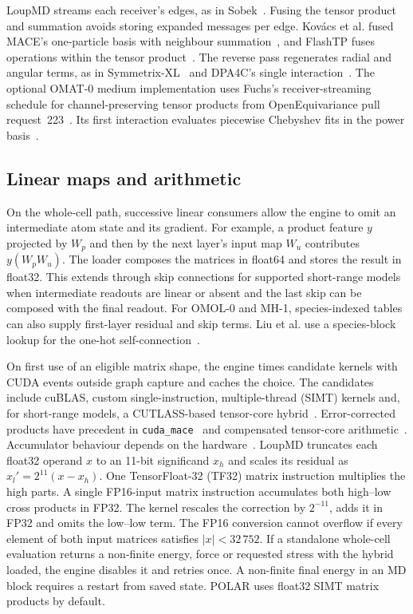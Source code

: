 LoupMD streams each receiver's edges, as in Sobek~\cite{chorosajev2026sobek}. Fusing the tensor product and summation avoids storing expanded messages per edge. Kov\'acs et al. fused MACE's one-particle basis with neighbour summation~\cite[\S III.5]{kovacs2025maceoff}, and FlashTP fuses operations within the tensor product~\cite[\S\S 4.2--4.4]{lee2025flashtp}. The reverse pass regenerates radial and angular terms, as in Symmetrix-XL~\cite[\S 3]{fu2026symmetrixxl} and DPA4C's single interaction~\cite[\S 4.4]{li2026dpa4c}. The optional OMAT-0 medium implementation uses Fuchs's receiver-streaming schedule for channel-preserving tensor products from OpenEquivariance pull request~223~\cite{fuchs2026uvupr}. Its first interaction evaluates piecewise Chebyshev fits in the power basis~\cite{trefethen2013approx}.

\subsection{Linear maps and arithmetic}
On the whole-cell path, successive linear consumers allow the engine to omit an intermediate atom state and its gradient. For example, a product feature $y$ projected by $W_p$ and then by the next layer's input map $W_u$ contributes $y(W_pW_u)$. The loader composes the matrices in float64 and stores the result in float32. This extends through skip connections for supported short-range models when intermediate readouts are linear or absent and the last skip can be composed with the final readout. For OMOL-0 and MH-1, species-indexed tables can also supply first-layer residual and skip terms. Liu et al. use a species-block lookup for the one-hot self-connection~\cite[\S 3.6]{liu2026foundation}.

On first use of an eligible matrix shape, the engine times candidate kernels with CUDA events outside graph capture and caches the choice. The candidates include cuBLAS, custom single-instruction, multiple-thread (SIMT) kernels and, for short-range models, a CUTLASS-based tensor-core hybrid~\cite{thakkar2023cutlass}. Error-corrected products have precedent in \texttt{cuda\_mace}~\cite[\S III.5]{kovacs2025maceoff} and compensated tensor-core arithmetic~\cite{ootomo2022recovery}. Accumulator behaviour depends on the hardware~\cite{fasi2021tensorcores}. LoupMD truncates each float32 operand $x$ to an 11-bit significand $x_h$ and scales its residual as $x_l'=2^{11}(x-x_h)$. One TensorFloat-32 (TF32) matrix instruction multiplies the high parts. A single FP16-input matrix instruction accumulates both high--low cross products in FP32. The kernel rescales the correction by $2^{-11}$, adds it in FP32 and omits the low--low term. The FP16 conversion cannot overflow if every element of both input matrices satisfies $|x|<32\,752$. If a standalone whole-cell evaluation returns a non-finite energy, force or requested stress with the hybrid loaded, the engine disables it and retries once. A non-finite final energy in an MD block requires a restart from saved state. POLAR uses float32 SIMT matrix products by default.

